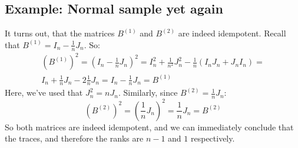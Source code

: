 \documentclass[12pt, a4paper]{article}
\begin{document}
\subsection{Example: Normal sample yet again}
It turns out, that the matrices $B^{(1)}$ and $B^{(2)}$ are indeed idempotent. Recall that $B^{(1)}=I_n-\frac{1}{n}J_n$. So:
\begin{equation}
\begin{multlined}
(B^{(1)})^2=\left(I_n-\frac{1}{n}J_n\right)^2=I_n^2+\frac{1}{n^2}J_n^2-\frac{1}{n}(I_n J_n + J_n I_n)=\\
I_n+\frac{1}{n}J_n-2\frac{1}{n}J_n=I_n-\frac{1}{n}J_n=B^{(1)}
\end{multlined}
\end{equation}
Here, we've used that $J_n^2=nJ_n$. Similarly, since $B^{(2)}=\frac{1}{n}J_n$: 
\begin{equation}
(B^{(2)})^2=\left(\frac{1}{n}J_n\right)^2=\frac{1}{n}J_n=B^{(2)}
\end{equation}
So both matrices are indeed idempotent, and we can immediately conclude that the traces, and therefore the ranks are $n-1$ and $1$ respectively.
\end{document}
